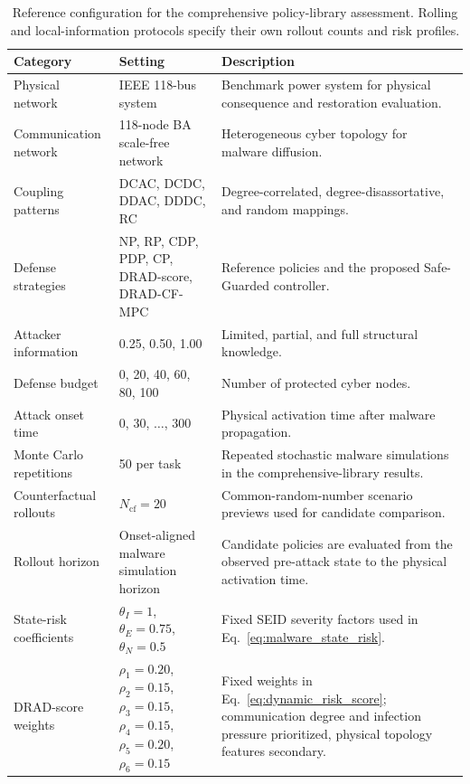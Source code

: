 \begin{table}[t]
\centering
\caption{Reference configuration for the comprehensive policy-library assessment. Rolling and local-information protocols specify their own rollout counts and risk profiles.}
\label{tab:experimental_configuration}
\small
\begin{tabular}{p{} p{} p{}}
\toprule
\rowcolor{TableHeader}
Category & Setting & Description \\
\midrule
\rowcolor{RowScenario}
Physical network & IEEE 118-bus system & Benchmark power system for physical consequence and restoration evaluation. \\
\rowcolor{RowBaseline}
Communication network & 118-node BA scale-free network & Heterogeneous cyber topology for malware diffusion. \\
\rowcolor{RowScenario}
Coupling patterns & DCAC, DCDC, DDAC, DDDC, RC & Degree-correlated, degree-disassortative, and random mappings. \\
\rowcolor{RowProposed}
Defense strategies & NP, RP, CDP, PDP, CP, DRAD-score, DRAD-CF-MPC & Reference policies and the proposed Safe-Guarded controller. \\
\rowcolor{RowRisk}
Attacker information & 0.25, 0.50, 1.00 & Limited, partial, and full structural knowledge. \\
\rowcolor{RowBudget}
Defense budget & 0, 20, 40, 60, 80, 100 & Number of protected cyber nodes. \\
\rowcolor{RowPhysical}
Attack onset time & 0, 30, $\ldots$, 300 & Physical activation time after malware propagation. \\
\rowcolor{RowScenario}
Monte Carlo repetitions & 50 per task & Repeated stochastic malware simulations in the comprehensive-library results. \\
\rowcolor{RowBaseline}
Counterfactual rollouts & $N_{\mathrm{cf}}=20$ & Common-random-number scenario previews used for candidate comparison. \\
\rowcolor{RowScenario}
Rollout horizon & Onset-aligned malware simulation horizon & Candidate policies are evaluated from the observed pre-attack state to the physical activation time. \\
\rowcolor{RowRisk}
State-risk coefficients & $\theta_I=1$, $\theta_E=0.75$, $\theta_N=0.5$ & Fixed SEID severity factors used in Eq.~\eqref{eq:malware_state_risk}. \\
\rowcolor{RowBudget}
DRAD-score weights & $\rho_1{=}0.20$, $\rho_2{=}0.15$, $\rho_3{=}0.15$, $\rho_4{=}0.15$, $\rho_5{=}0.20$, $\rho_6{=}0.15$ & Fixed weights in Eq.~\eqref{eq:dynamic_risk_score}; communication degree and infection pressure prioritized, physical topology features secondary. \\

\end{tabular}
\end{table}
